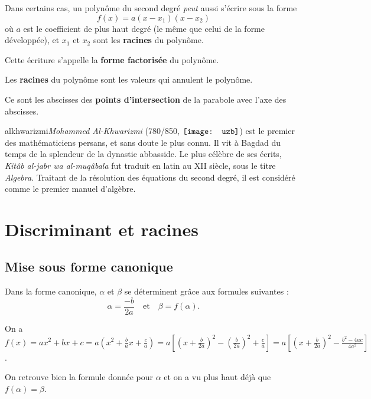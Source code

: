 \documentclass[a4paper,11pt]{article}
\begin{document}
\begin{cdefi}
Dans certains cas, un polynôme du second degré \textit{peut} aussi s'écrire sous la forme  \[f(x)=a(x-x_1)(x-x_2) \] où $a$ est le coefficient de plus haut degré (le même que celui de la forme développée), et $x_1$ et $x_2$ sont les \textbf{racines} du polynôme.

Cette écriture s'appelle la \textbf{forme factorisée} du polynôme.
\end{cdefi}

\begin{cprop}
Les \textbf{racines} du polynôme sont les valeurs qui annulent le polynôme.

Ce sont les abscisses des \textbf{points d'intersection} de la parabole avec l'axe des abscisses.
\end{cprop}

\begin{chistoire}
\vspace{-0.22cm}
\lettrine[findent=.5em,nindent=0pt,lines=3,image,novskip=0pt]{alkhwarizmi}{}\textit{Mohammed Al-Khwarizmi} (780/850, $\vcenter{\hbox{\texttt{[image: uzb]}}}$) est le premier des mathématiciens persans, et sans doute le plus connu. Il vit à Bagdad du temps de la splendeur de la dynastie abbasside. Le plus célèbre de ses écrits, \textit{Kitâb al-jabr wa al-muqâbala} fut traduit en latin au XII siècle, sous le titre \textit{Algebra}. Traitant de la résolution des équations du second degré, il est considéré comme le premier manuel d'algèbre.
\end{chistoire}

\section{Discriminant et racines}

\subsection{Mise sous forme canonique}

\begin{cprop}
Dans la forme canonique, $\alpha$ et $\beta$ se déterminent grâce aux formules suivantes : \[ \alpha=\frac{-b}{2a} \quad \mbox{et} \quad \beta=f(\alpha).\]
\end{cprop}

\begin{cdemo}
On a $f(x)=ax^2+bx+c=a \left(x^2+\frac{b}{a}x+\frac{c}{a}\right)=a\left[ \left(x+\frac{b}{2a} \right)^2-\left(\frac{b}{2a}\right)^2+\frac{c}{a} \right] = a\left[ \left(x+ \frac{b}{2a} \right)^2-\frac{b^2-4ac}{4a^2} \right]$.

\smallskip

On retrouve bien la formule donnée pour $\alpha$ et on a vu plus haut déjà que $f(\alpha)=\beta$.
\end{cdemo}
\end{document}
